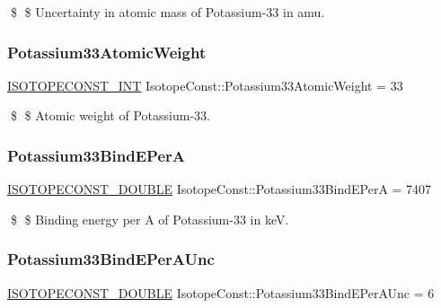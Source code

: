 \$ \$ Uncertainty in atomic mass of Potassium-\/33 in amu. \mbox{\label{group___isotope_const-_potassium-_k33_ga2d356252fa624c87ce43b75071e71a99}} 
\subsubsection{\texorpdfstring{Potassium33\+Atomic\+Weight}{Potassium33AtomicWeight}}
{\footnotesize\ttfamily \mbox{\hyperlink{group___isotope_const-_macros_ga5f18360b3e99483a35c32d789e62621c}{I\+S\+O\+T\+O\+P\+E\+C\+O\+N\+S\+T\+\_\+\+I\+NT}} Isotope\+Const\+::\+Potassium33\+Atomic\+Weight = 33}

\$ \$ Atomic weight of Potassium-\/33. \mbox{\label{group___isotope_const-_potassium-_k33_ga71ea69c9b9591d178f64aefdefdd5fcd}} 
\subsubsection{\texorpdfstring{Potassium33\+Bind\+E\+PerA}{Potassium33BindEPerA}}
{\footnotesize\ttfamily \mbox{\hyperlink{group___isotope_const-_macros_ga8f45a7272ce02c0b4c65c44636ed719a}{I\+S\+O\+T\+O\+P\+E\+C\+O\+N\+S\+T\+\_\+\+D\+O\+U\+B\+LE}} Isotope\+Const\+::\+Potassium33\+Bind\+E\+PerA = 7407}

\$ \$ Binding energy per A of Potassium-\/33 in keV. \mbox{\label{group___isotope_const-_potassium-_k33_ga1b28e1f05c3ef83cb12e4a3ba5aed251}} 
\subsubsection{\texorpdfstring{Potassium33\+Bind\+E\+Per\+A\+Unc}{Potassium33BindEPerAUnc}}
{\footnotesize\ttfamily \mbox{\hyperlink{group___isotope_const-_macros_ga8f45a7272ce02c0b4c65c44636ed719a}{I\+S\+O\+T\+O\+P\+E\+C\+O\+N\+S\+T\+\_\+\+D\+O\+U\+B\+LE}} Isotope\+Const\+::\+Potassium33\+Bind\+E\+Per\+A\+Unc = 6}


